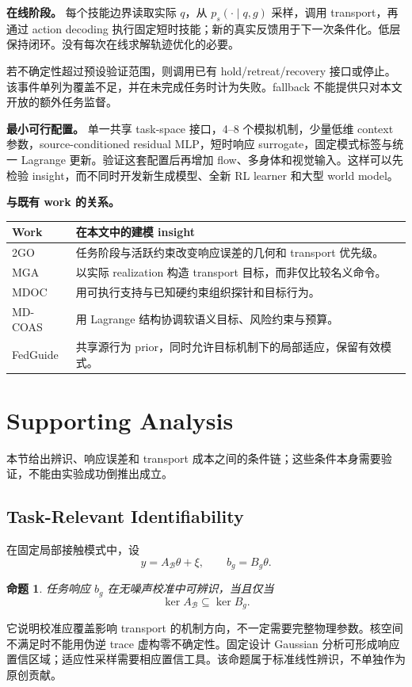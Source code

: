 \documentclass[11pt]{article}
\newtheorem{proposition}{命题}[section]
\begin{document}
\textbf{在线阶段。} 每个技能边界读取实际 $q$，从 $p_s(\cdot\mid q,g)$ 采样，调用 transport，再通过 action decoding 执行固定短时技能；新的真实反馈用于下一次条件化。低层保持闭环。没有每次在线求解轨迹优化的必要。

若不确定性超过预设验证范围，则调用已有 hold/retreat/recovery 接口或停止。该事件单列为覆盖不足，并在未完成任务时计为失败。fallback 不能提供只对本文开放的额外任务监督。

\textbf{最小可行配置。} 单一共享 task-space 接口，4--8 个模拟机制，少量低维 context 参数，source-conditioned residual MLP，短时响应 surrogate，固定模式标签与统一 Lagrange 更新。验证这套配置后再增加 flow、多身体和视觉输入。这样可以先检验 insight，而不同时开发新生成模型、全新 RL learner 和大型 world model。

\textbf{与既有 work 的关系。}
\begin{center}
\small
\begin{tabularx}{\linewidth}{L{1.9cm}Y}
\toprule
Work & 在本文中的建模 insight\\\midrule
2GO & 任务阶段与活跃约束改变响应误差的几何和 transport 优先级。\\
MGA & 以实际 realization 构造 transport 目标，而非仅比较名义命令。\\
MDOC & 用可执行支持与已知硬约束组织探针和目标行为。\\
MD-COAS & 用 Lagrange 结构协调软语义目标、风险约束与预算。\\
FedGuide & 共享源行为 prior，同时允许目标机制下的局部适应，保留有效模式。\\
\bottomrule
\end{tabularx}
\end{center}

\section{Supporting Analysis}
\label{sec:theory}
本节给出辨识、响应误差和 transport 成本之间的条件链；这些条件本身需要验证，不能由实验成功倒推出成立。

\subsection{Task-Relevant Identifiability}
在固定局部接触模式中，设
\begin{equation}
 y=A_{\mathcal B}\theta+\xi,\qquad b_g=B_g\theta.
\end{equation}
\begin{proposition}
任务响应 $b_g$ 在无噪声校准中可辨识，当且仅当
\begin{equation}
 \ker A_{\mathcal B}\subseteq\ker B_g.
\end{equation}
\end{proposition}
它说明校准应覆盖影响 transport 的机制方向，不一定需要完整物理参数。核空间不满足时不能用伪逆 trace 虚构零不确定性。固定设计 Gaussian 分析可形成响应置信区域；适应性采样需要相应置信工具。该命题属于标准线性辨识，不单独作为原创贡献。
\end{document}
